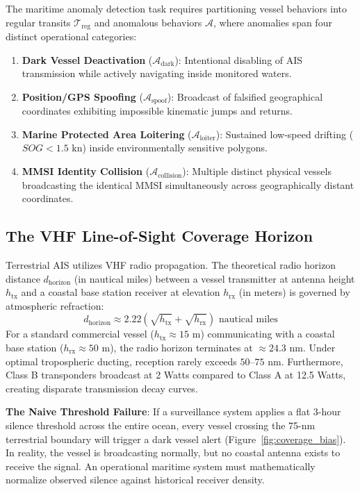 \documentclass[10pt,twocolumn,a4paper]{article}
\begin{document}
The maritime anomaly detection task requires partitioning vessel behaviors into regular transits $\mathcal{T}_{\text{reg}}$ and anomalous behaviors $\mathcal{A}$, where anomalies span four distinct operational categories:
\begin{enumerate}[leftmargin=*]
    \item \textbf{Dark Vessel Deactivation} ($\mathcal{A}_{\text{dark}}$): Intentional disabling of AIS transmission while actively navigating inside monitored waters.
    \item \textbf{Position/GPS Spoofing} ($\mathcal{A}_{\text{spoof}}$): Broadcast of falsified geographical coordinates exhibiting impossible kinematic jumps and returns.
    \item \textbf{Marine Protected Area Loitering} ($\mathcal{A}_{\text{loiter}}$): Sustained low-speed drifting ($SOG < 1.5\text{ kn}$) inside environmentally sensitive polygons.
    \item \textbf{MMSI Identity Collision} ($\mathcal{A}_{\text{collision}}$): Multiple distinct physical vessels broadcasting the identical MMSI simultaneously across geographically distant coordinates.
\end{enumerate}

\subsection{The VHF Line-of-Sight Coverage Horizon}
Terrestrial AIS utilizes VHF radio propagation. The theoretical radio horizon distance $d_{\text{horizon}}$ (in nautical miles) between a vessel transmitter at antenna height $h_{\text{tx}}$ and a coastal base station receiver at elevation $h_{\text{rx}}$ (in meters) is governed by atmospheric refraction:
\begin{equation}
    d_{\text{horizon}} \approx 2.22 \left(\sqrt{h_{\text{tx}}} + \sqrt{h_{\text{rx}}}\right) \text{ nautical miles}
\end{equation}
For a standard commercial vessel ($h_{\text{tx}} \approx 15\text{ m}$) communicating with a coastal base station ($h_{\text{rx}} \approx 50\text{ m}$), the radio horizon terminates at $\approx 24.3\text{ nm}$. Under optimal tropospheric ducting, reception rarely exceeds $50\text{--}75\text{ nm}$. Furthermore, Class B transponders broadcast at 2 Watts compared to Class A at 12.5 Watts, creating disparate transmission decay curves. 

\textbf{The Naive Threshold Failure}: If a surveillance system applies a flat 3-hour silence threshold across the entire ocean, every vessel crossing the 75-nm terrestrial boundary will trigger a dark vessel alert (Figure~\ref{fig:coverage_bias}). In reality, the vessel is broadcasting normally, but no coastal antenna exists to receive the signal. An operational maritime system must mathematically normalize observed silence against historical receiver density.
\end{document}
